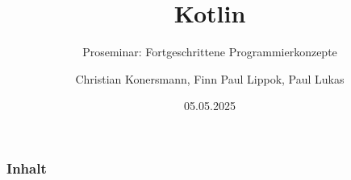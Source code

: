 \documentclass{beamer}
\title{Kotlin}
\subtitle{Proseminar: Fortgeschrittene Programmierkonzepte}
\author[Konersmann, Lippok, Lukas]{
  Christian Konersmann, Finn Paul Lippok, Paul Lukas
}
\date{05.05.2025}
\begin{document}
\frame{\titlepage}
\begin{frame}
  \frametitle{Inhalt}
  \tableofcontents
\end{frame}
\end{document}
